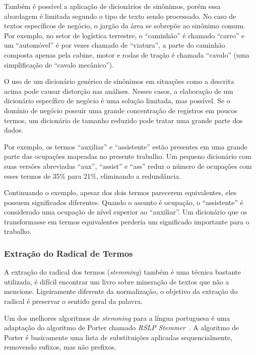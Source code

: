 \documentclass[12pt,a4paper]{article}
\begin{document}
Também é possível a aplicação de dicionários de sinônimos, porém essa abordagem é limitada segundo o tipo de texto sendo processado. No caso de textos específicos de negócio, o jargão da área se sobrepõe ao sinônimo comum. Por exemplo, no setor de logística terrestre, o \enquote{caminhão} é chamado \enquote{carro} e um \enquote{automóvel} é por vezes chamado de \enquote{viatura}, a parte do caminhão composta apenas pela cabine, motor e rodas de tração é chamada \enquote{cavalo} (uma simplificação de \enquote{cavalo mecânico}).

O uso de um dicionário genérico de sinônimos em situações como a descrita acima pode causar distorção nas análises. Nesses casos, a elaboração de um dicionário específico de negócio é uma solução limitada, mas possível. Se o domínio de negócio possuir uma grande concentração de registros em poucos termos, um dicionário de tamanho reduzido pode tratar uma grande parte dos dados.

Por exemplo, os termos \enquote{auxiliar} e \enquote{assistente} estão presentes em uma grande parte das ocupações mapeadas no presente trabalho. Um pequeno dicionário com suas versões abreviadas \enquote{aux}, \enquote{assist} e \enquote{ass} reduz o número de ocupações com esses termos de 35\% para 21\%, eliminando a redundância.

Continuando o exemplo, apesar dos dois termos parecerem equivalentes, eles possuem significados diferentes. Quando o assunto é ocupação, o \enquote{assistente} é considerado uma ocupação de nível superior ao \enquote{auxiliar}. Um dicionário que os transformasse em termos equivalentes perderia um significado importante para o trabalho.

\subsubsection*{Extração do Radical de Termos}
A extração do radical dos termos (\textit{stemming}) também é uma técnica bastante utilizada, é difícil encontrar um livro sobre mineração de textos que não a mencione. Ligeiramente diferente da normalização, o objetivo da extração do radical é preservar o sentido geral da palavra.

Um dos melhores algoritmos de \textit{stemming} para a língua portuguesa é uma adaptação do algoritmo de Porter chamado \textit{RSLP Stemmer}~\cite{Flores2010-gk}. A algoritmo de Porter é basicamente uma lista de substituições aplicadas sequencialmente, removendo sufixos, mas não prefixos.
\end{document}
